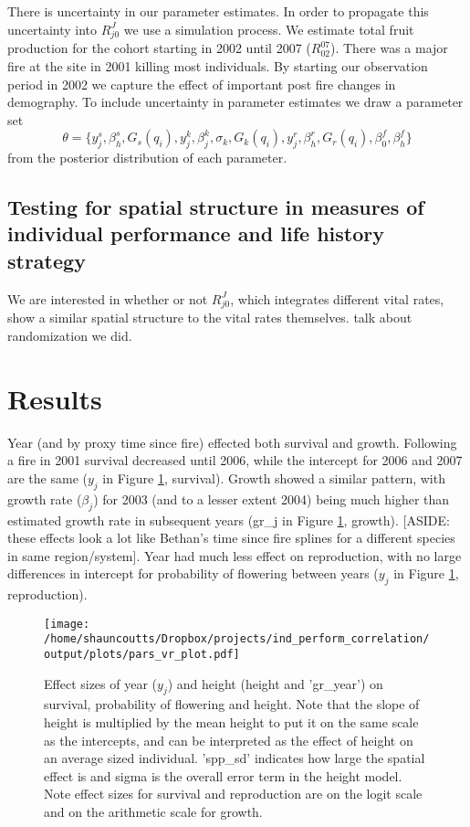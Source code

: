 \documentclass[12pt,a4paper]{article}
\begin{document}
There is uncertainty in our parameter estimates. In order to propagate this uncertainty into $R_{j0}^J$ we use a simulation process. We estimate total fruit production for the cohort starting in 2002 until 2007 ($R_{02}^{07}$). There was a major fire at the site in 2001 killing most individuals. By starting our observation period in 2002 we capture the effect of important post fire changes in demography. To include uncertainty in parameter estimates we draw a parameter set 
\begin{equation}
	\theta = \{ y_j^s, \beta_h^s, G_s(q_i), y_j^k, \beta_j^k, \sigma_k, G_k(q_i),  y_j^r, \beta_h^r, G_r(q_i), \beta_0^f, \beta_h^f \}
\end{equation}  
from the posterior distribution of each parameter.                        

\subsection*{Testing for spatial structure in measures of individual performance and life history strategy}
We are interested in whether or not $R_{j0}^J$, which integrates different vital rates, show a similar spatial structure to the vital rates themselves. talk about randomization we did.

\section*{Results}
Year (and by proxy time since fire) effected both survival and growth. Following a fire in 2001 survival decreased until 2006, while the intercept for 2006 and 2007 are the same ($y_j$ in Figure \ref{fig:effect_size}, survival). Growth showed a similar pattern, with growth rate ($\beta_j$) for 2003 (and to a lesser extent 2004) being much higher than estimated growth rate in subsequent years (gr\_j in Figure \ref{fig:effect_size}, growth). [ASIDE: these effects look a lot like Bethan's time since fire splines for a different species in same region/system]. Year had much less effect on reproduction, with no large differences in intercept for probability of flowering between years ($y_j$ in Figure \ref{fig:effect_size}, reproduction).     


\begin{figure}[!h] 
	\texttt{[image: /home/shauncoutts/Dropbox/projects/ind\_perform\_correlation/output/plots/pars\_vr\_plot.pdf]}
\caption{Effect sizes of year ($y_j$) and height (height and 'gr\_year') on survival, probability of flowering and height. Note that the slope of height is multiplied by the mean height to put it on the same scale as the intercepts, and can be interpreted as the effect of height on an average sized individual. 'spp\_sd' indicates how large the spatial effect is and sigma is the overall error term in the height model. Note effect sizes for survival and reproduction are on the logit scale and on the arithmetic scale for growth.} 
\label{fig:effect_size}
\end{figure}
\end{document}
